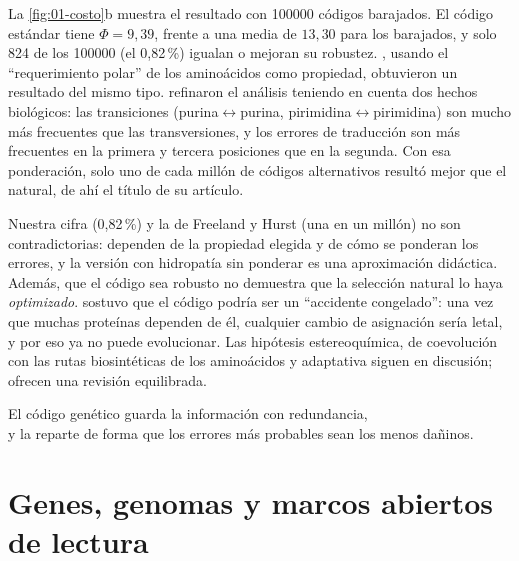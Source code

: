La \cref{fig:01-costo}b muestra el resultado con \num{100000} códigos barajados. El código estándar tiene $\Phi=9{,}39$, frente a una media de $13{,}30$ para los barajados, y solo 824 de los \num{100000} (el 0,82\,\%) igualan o mejoran su robustez. \textcite{c01-haig1991}, usando el ``requerimiento polar'' de los aminoácidos como propiedad, obtuvieron un resultado del mismo tipo. \textcite{c01-freeland1998} refinaron el análisis teniendo en cuenta dos hechos biológicos: las transiciones (purina$\leftrightarrow$purina, pirimidina$\leftrightarrow$pirimidina) son mucho más frecuentes que las transversiones, y los errores de traducción son más frecuentes en la primera y tercera posiciones que en la segunda. Con esa ponderación, solo uno de cada millón de códigos alternativos resultó mejor que el natural, de ahí el título de su artículo.

\begin{cuidado}
Nuestra cifra (0,82\,\%) y la de Freeland y Hurst (una en un millón) no son contradictorias: dependen de la propiedad elegida y de cómo se ponderan los errores, y la versión con hidropatía sin ponderar es una aproximación didáctica. Además, que el código sea robusto no demuestra que la selección natural lo haya \emph{optimizado}. \textcite{c01-crick1968} sostuvo que el código podría ser un ``accidente congelado'': una vez que muchas proteínas dependen de él, cualquier cambio de asignación sería letal, y por eso ya no puede evolucionar. Las hipótesis estereoquímica, de coevolución con las rutas biosintéticas de los aminoácidos y adaptativa siguen en discusión; \textcite{c01-koonin2009} ofrecen una revisión equilibrada.
\end{cuidado}

\begin{ideaclave}
El código genético guarda la información con redundancia,\\
y la reparte de forma que los errores más probables sean los menos dañinos.
\end{ideaclave}


\section{Genes, genomas y marcos abiertos de lectura}\label{sec:01-orfs}


